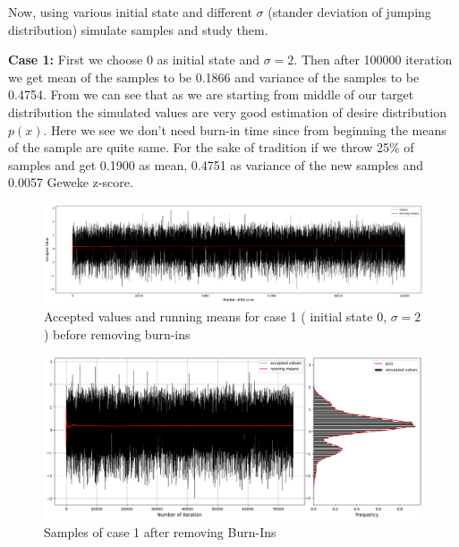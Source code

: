 \begin{example}
    Now, using various initial state and different $ \sigma $ (stander deviation of jumping distribution) simulate samples and study them. 

    \textbf{Case 1:} First we choose $ 0 $ as initial state and $ \sigma = 2 $. Then after 100000 iteration we get mean of the samples to be 0.1866 and variance of the samples to be 0.4754. 
        From  we can see that as we are starting from middle of our target distribution the simulated values are very good estimation of desire distribution $ p(x) $. Here we see we don't need burn-in time since from beginning the means of the sample are quite same. For the sake of tradition if we throw 25\% of samples and get 0.1900 as mean, 0.4751 as variance of the new samples and 0.0057 Geweke z-score. 

    \begin{figure}[H]
        \centering
        \includegraphics[width=1\textwidth]{./images/metropolis/sample-1-values.png}
        \caption{Accepted values and running means for case 1 ( initial state 0, $ \sigma = 2 $ ) before removing burn-ins}
        \label{fig:MH sample 1 values}
    \end{figure}

    \begin{figure}[H]
        \centering
        \includegraphics[width=1\textwidth]{./images/metropolis/sample-1-value-hist-bo.png}
        \caption{Samples of case 1 after removing Burn-Ins}
        \label{fig:MH sample 1 after burn-in}
    \end{figure}


\end{example}

